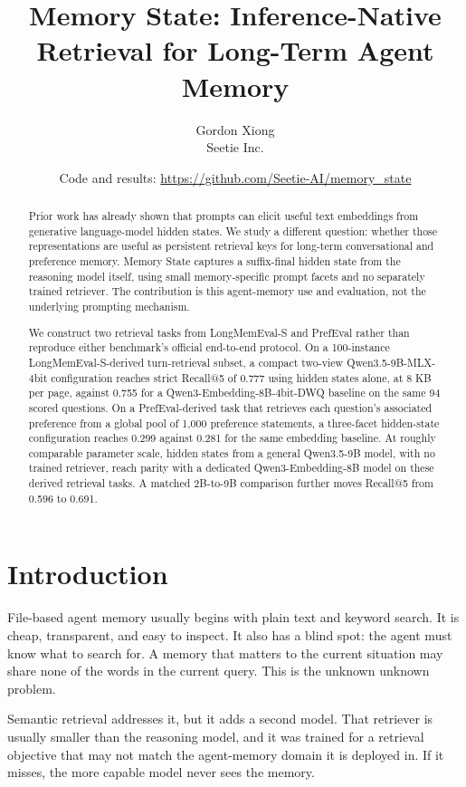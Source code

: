 \documentclass[
  10pt,
  letterpaper,
]{article}
\title{Memory State: Inference-Native Retrieval for Long-Term Agent
Memory}
\author{Gordon Xiong\\\small Seetie Inc.}
\date{\small Code and results: \url{https://github.com/Seetie-AI/memory_state}}
\begin{document}
\maketitle

\begin{abstract}

Prior work has already shown that prompts can elicit useful text
embeddings from generative language-model hidden states. We study a
different question: whether those representations are useful as
persistent retrieval keys for long-term conversational and preference
memory. Memory State captures a suffix-final hidden state from the
reasoning model itself, using small memory-specific prompt facets and no
separately trained retriever. The contribution is this
agent-memory use and evaluation, not the underlying prompting mechanism.

We construct two retrieval tasks from LongMemEval-S and PrefEval rather
than reproduce either benchmark's official end-to-end protocol. On a
100-instance LongMemEval-S-derived turn-retrieval subset, a compact
two-view Qwen3.5-9B-MLX-4bit configuration reaches strict Recall@5 of
0.777 using hidden states alone, at 8 KB per page, against 0.755 for a
Qwen3-Embedding-8B-4bit-DWQ baseline on the same 94 scored questions. On
a PrefEval-derived task that retrieves each question's associated
preference from a global pool of 1,000 preference statements, a
three-facet hidden-state configuration reaches 0.299 against 0.281 for
the same embedding baseline. At roughly comparable parameter scale,
hidden states from a general Qwen3.5-9B model, with no trained retriever,
reach parity with a dedicated Qwen3-Embedding-8B model on these derived
retrieval tasks. A matched 2B-to-9B
comparison further moves Recall@5 from 0.596 to 0.691.

\end{abstract}

\section{Introduction}\label{introduction}

File-based agent memory usually begins with plain text and keyword
search. It is cheap, transparent, and easy to inspect. It also has a
blind spot: the agent must know what to search for. A memory that
matters to the current situation may share none of the words in the
current query. This is the unknown unknown problem.

Semantic retrieval addresses it, but it adds a second model. That
retriever is usually smaller than the reasoning model, and it was
trained for a retrieval objective that may not match the agent-memory
domain it is deployed in. If it misses, the more capable model never
sees the memory.
\end{document}
